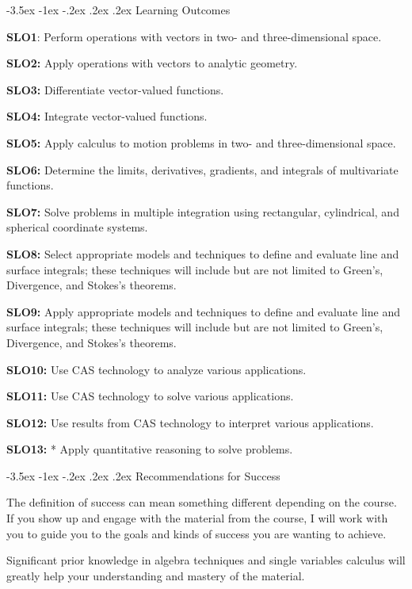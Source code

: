 \documentclass{article}
\makeatletter
\renewcommand\section{\@startsection{section}{1}{0pt}%
  {-3.5ex \@plus -1ex \@minus -.2ex}%
  {.2ex \@plus.2ex}%
  {\normalfont\Large\bfseries}} %
\makeatother
\begin{document}
\section{Learning Outcomes}

\textbf{SLO1}: Perform operations with vectors in two- and three-dimensional space.

\textbf{SLO2:} Apply operations with vectors to analytic geometry.

\textbf{SLO3:} Differentiate vector-valued functions.

\textbf{SLO4:} Integrate vector-valued functions.

\textbf{SLO5:} Apply calculus to motion problems in two- and three-dimensional space.

\textbf{SLO6:} Determine the limits, derivatives, gradients, and integrals of multivariate functions.

\textbf{SLO7:} Solve problems in multiple integration using rectangular, cylindrical, and spherical coordinate systems.

\textbf{SLO8:} Select appropriate models and techniques to define and evaluate line and surface integrals; these techniques will include but are not limited to Green's, Divergence, and Stokes's theorems.

\textbf{SLO9:} Apply appropriate models and techniques to define and evaluate line and surface integrals; these techniques will include but are not limited to Green's, Divergence, and Stokes's theorems.

\textbf{SLO10:} Use CAS technology to analyze various applications.

\textbf{SLO11:} Use CAS technology to solve various applications.

\textbf{SLO12:} Use results from CAS technology to interpret various applications.

\textbf{SLO13:} * Apply quantitative reasoning to solve problems.

\section{Recommendations for Success}

The definition of success can mean something different depending on the course. If you show up and engage with the material from the course, I will work with you to guide you to the goals and kinds of success you are wanting to achieve.

Significant prior knowledge in algebra techniques and single variables calculus will greatly help your understanding and mastery of the material.
\end{document}
